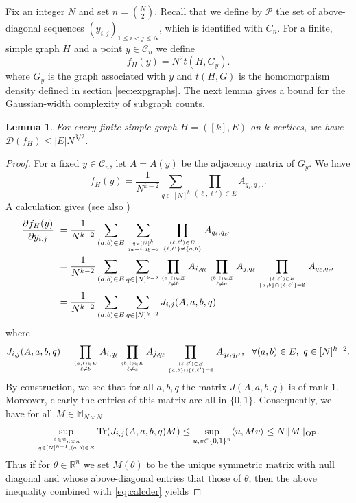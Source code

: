 \documentclass[12pt]{article}
\def \RR {\mathbb R}
\def \tr {\mathrm{Tr}}
\def \DC {\mathcal{C}_n}
\def \Comp { \mathcal{D} }
\newtheorem{lemma}[theorem]{Lemma}
\theoremstyle{definition}
\theoremstyle{remark}
\begin{document}
Fix an integer $N$ and set $n = {N \choose 2}$. Recall that we define by $\mathcal{P}$ the set of above-diagonal sequences $(y_{i,j})_{1 \leq i < j \leq N}$, which is identified with $C_n$. For a finite, simple graph $H$ and a point $y \in \DC$ we define
$$
f_H(y) = N^2 t(H,G_y).
$$
where $G_y$ is the graph associated with $y$ and $t(H,G)$ is the homomorphism density defined in section \ref{sec:expgraphs}. The next lemma gives a bound for the Gaussian-width complexity of subgraph counts.
\begin{lemma} \label{lem:subgraphcomplexity}
	For every finite simple graph $H=([k],E)$ on $k$ vertices, we have $\Comp(f_H) \leq |E| N^{3/2}$.
\end{lemma}
\begin{proof}
	For a fixed $y \in \DC$, let $A=A(y)$ be the adjacency matrix of $G_y$. We have
	$$
	f_H(y) = \frac{1}{N^{k-2}} \sum_{q \in [N]^k} \prod_{(\ell,\ell') \in E} A_{q_\ell, q_{\ell'}}.
	$$
	A calculation gives (see also \cite[Equation (5.2)]{CD14})
	\begin{align} \label{eq:calcder}
	\frac{\partial f_H(y)}{\partial y_{i,j}} ~& = \frac{1}{N^{k-2}} \sum_{(a,b) \in E} \sum_{q \in [N]^{k} \atop q_a = i, q_b = j} \prod_{(\ell,\ell') \in E \atop \{\ell,\ell'\} \neq \{a,b\}} A_{q_\ell, q_{\ell'}} \\
	& = \frac{1}{N^{k-2}} \sum_{(a,b) \in E} \sum_{q \in [N]^{k-2}} \prod_{(a,\ell) \in E \atop \ell \neq b} A_{i, q_{\ell}} \prod_{(b,\ell) \in E \atop \ell \neq a} \nonumber A_{j, q_{\ell}} \prod_{(\ell, \ell') \in E \atop \{a,b\} \cap \{\ell, \ell' \} = \emptyset} A_{q_\ell, q_{\ell'}} \nonumber \\
	& = \frac{1}{N^{k-2}} \sum_{(a,b) \in E} \sum_{q \in [N]^{k-2}} J_{i,j}(A,a,b,q) \nonumber
	\end{align}
	where 
	$$
	J_{i,j}(A,a,b,q) = \prod_{(a,\ell) \in E \atop \ell \neq b} A_{i, q_{\ell}} \prod_{(b,\ell) \in E \atop \ell \neq a} A_{j, q_{\ell}} \prod_{(\ell, \ell') \in E \atop \{a,b\} \cap \{\ell, \ell' \} = \emptyset} A_{q_\ell, q_{\ell'}}, ~~ \forall (a,b) \in E, ~ q \in [N]^{k-2}.
	$$
	By construction, we see that for all $a,b,q$ the matrix $J(A,a,b,q)$ is of rank $1$. Moreover, clearly the entries of this matrix are all in $\{0,1\}$. Consequently, we have for all $M \in \mathbb{M}_{N \times N}$
	$$
	\sup_{A \in \mathbb{M}_{n \times n} \atop q \in [N]^{k-1}, (a,b) \in E} \tr(J_{i,j}(A,a,b,q) M) \leq \sup_{u,v \in \{0,1\}^n} \langle u, M v \rangle \leq N \Vert M \Vert_{\mathrm{OP}}.
	$$
	Thus if for $\theta \in \RR^n$ we set $M(\theta)$ to be the unique symmetric matrix with null diagonal and whose above-diagonal entries that those of $\theta$, then the above inequality combined with \eqref{eq:calcder} yields

\end{proof}
\end{document}
